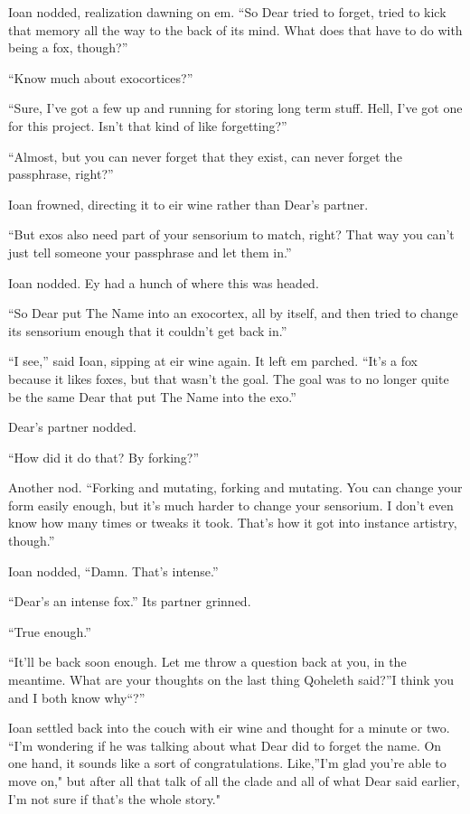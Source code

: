 Ioan nodded, realization dawning on em. ``So Dear tried to forget, tried to kick that memory all the way to the back of its mind. What does that have to do with being a fox, though?''

``Know much about exocortices?''

``Sure, I've got a few up and running for storing long term stuff. Hell, I've got one for this project. Isn't that kind of like forgetting?''

``Almost, but you can never forget that they exist, can never forget the passphrase, right?''

Ioan frowned, directing it to eir wine rather than Dear's partner.

``But exos also need part of your sensorium to match, right? That way you can't just tell someone your passphrase and let them in.''

Ioan nodded. Ey had a hunch of where this was headed.

``So Dear put The Name into an exocortex, all by itself, and then tried to change its sensorium enough that it couldn't get back in.''

``I see,'' said Ioan, sipping at eir wine again. It left em parched. ``It's a fox because it likes foxes, but that wasn't the goal. The goal was to no longer quite be the same Dear that put The Name into the exo.''

Dear's partner nodded.

``How did it do that? By forking?''

Another nod. ``Forking and mutating, forking and mutating. You can change your form easily enough, but it's much harder to change your sensorium. I don't even know how many times or tweaks it took. That's how it got into instance artistry, though.''

Ioan nodded, ``Damn. That's intense.''

``Dear's an intense fox.'' Its partner grinned.

``True enough.''

``It'll be back soon enough. Let me throw a question back at you, in the meantime. What are your thoughts on the last thing Qoheleth said?''I think you and I both know why``?''

Ioan settled back into the couch with eir wine and thought for a minute or two. ``I'm wondering if he was talking about what Dear did to forget the name. On one hand, it sounds like a sort of congratulations. Like,''I'm glad you're able to move on," but after all that talk of all the clade and all of what Dear said earlier, I'm not sure if that's the whole story."

